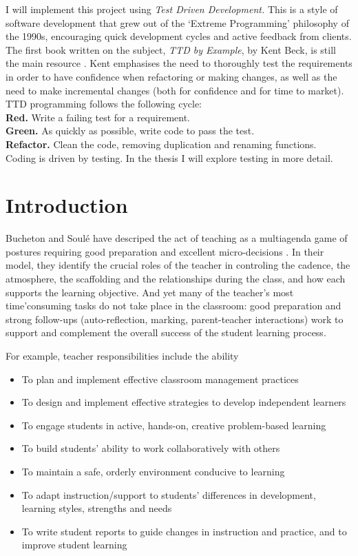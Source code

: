 \documentclass[10pt]{article}
\begin{document}
I will implement this project using \emph{Test Driven Development.} This is a style of software development that grew out of the `Extreme Programming' philosophy of the 1990s, encouraging quick development cycles and active feedback from clients. The first book written on the subject, \emph{TTD by Example}, by Kent Beck, is still the main resource \cite{Beck03}. Kent emphasises the need to thoroughly test the requirements in order to have confidence when refactoring or making changes, as well as the need to make incremental changes (both for confidence and for time to market). TTD programming follows the following cycle: \\
\indent \textbf{Red.} Write a failing test for a requirement. \\
\indent \textbf{Green.} As quickly as possible, write code to pass the test. \\
\indent \textbf{Refactor.} Clean the code, removing duplication and renaming functions. \\
Coding is driven by testing. In the thesis I will explore testing in more detail.




\section{Introduction}

Bucheton and Soulé have descriped the act of teaching as a multiagenda game of postures requiring good preparation and excellent micro-decisions \cite{BS09}. In their model, they identify the crucial roles of the teacher in controling the cadence, the atmosphere, the scaffolding and the relationships during the class, and how each supports the learning objective. And yet many of the teacher's most time'consuming tasks do not take place in the classroom: good preparation and strong follow-ups (auto-reflection, marking, parent-teacher interactions) work to support and complement the overall success of the student learning process.

For example, teacher responsibilities include the ability
\begin{itemize}
\item To plan and implement effective classroom management practices
\item To design and implement effective strategies to develop independent learners
\item To engage students in active, hands-on, creative problem-based learning
\item To build students’ ability to work collaboratively with others
\item To maintain a safe, orderly environment conducive to learning
\item To adapt instruction/support to students’ differences in development, learning styles, strengths and needs
\item To write student reports to guide changes in instruction and practice, and to improve student learning
\end{itemize}
\end{document}
